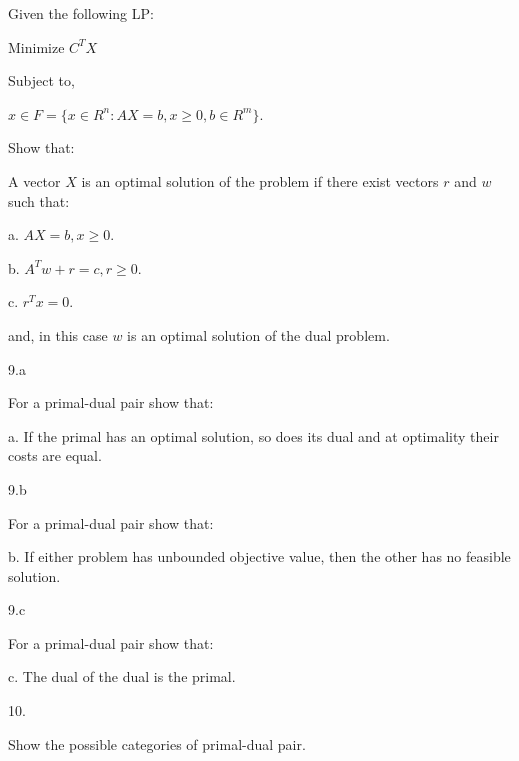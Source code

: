 \documentclass{article}
\begin{document}
\begin{customthm}{7}
  $ $

  Given the following LP: 
  
  \qquad Minimize $C^TX$ 
  
  Subject to, 
  
  \qquad $x \in F = \{x \in R^n: AX=b, x\geq 0, b\in R^m \}$.
  \newline

  Show that:

  \qquad A vector $X$ is an optimal solution of the problem if there exist vectors $r$ and $w$ such that:
  
  \qquad\qquad a. $AX = b, x\geq 0$.

  \qquad\qquad b. $A^Tw + r = c, r\geq 0$.

  \qquad\qquad c. $r^Tx = 0$.

  \qquad and, in this case $w$ is an optimal solution of the dual problem.

\end{customthm}
\newpage

\begin{customthm}{9.a}
  $ $

  For a primal-dual pair show that:

  \qquad a. If the primal has an optimal solution, so does its dual and at optimality their costs are equal.

\end{customthm}
\newpage

\begin{customthm}{9.b}
  $ $

  For a primal-dual pair show that:

  \qquad b. If either problem has unbounded objective value, then the other has no feasible solution.

\end{customthm}
\newpage

\begin{customthm}{9.c}
  $ $

  For a primal-dual pair show that:

  \qquad c. The dual of the dual is the primal.

\end{customthm}
\newpage

\begin{customthm}{10.}
  $ $

  Show the possible categories of primal-dual pair.

\end{customthm}
\newpage
\end{document}
